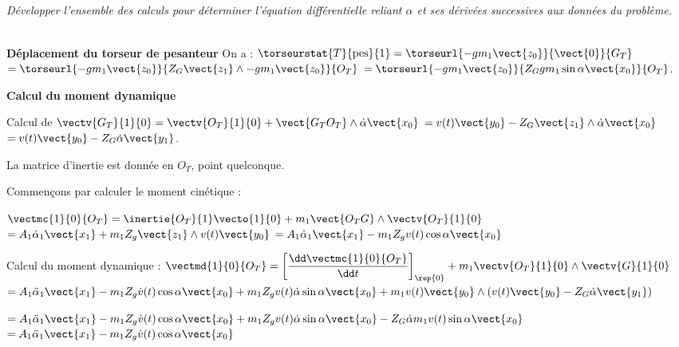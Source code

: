 \begin{multicols}{2}
\subparagraph{} \textit{Développer l'ensemble des calculs pour déterminer l'équation différentielle reliant $\alpha$ et ses dérivées
successives aux données du problème.}
\ifprof
\begin{corrige} ~\\

\textbf{Déplacement du torseur de pesanteur}
On a : $\torseurstat{T}{\text{pes}}{1} = \torseurl{-gm_1\vect{z_0}}{\vect{0}}{G_T}$ 
$= \torseurl{-gm_1\vect{z_0}}{Z_G \vect{z_1}\wedge -gm_1\vect{z_0}}{O_T}$
$= \torseurl{-gm_1\vect{z_0}}{Z_G gm_1\sin\alpha \vect{x_0}}{O_T}$.


\textbf{Calcul du moment dynamique} 

Calcul de $\vectv{G_T}{1}{0} =\vectv{O_T}{1}{0} + \vect{G_TO_T} \wedge \dot{\alpha} \vect{x_0}$
$=v(t)\vect{y_0}-Z_G\vect{z_1} \wedge \dot{\alpha}\vect{x_0}$
$=v(t)\vect{y_0}-Z_G \dot{\alpha}\vect{y_1}$.


La matrice d'inertie est donnée en $O_T$, point quelconque. 

Commençons par calculer le moment cinétique : 

$\vectmc{1}{0}{O_T} = \inertie{O_T}{1}\vecto{1}{0}+m_1\vect{O_TG} \wedge \vectv{O_T}{1}{0}$
$=A_1\dot{\alpha}_1 \vect{x_1}  + m_1 Z_g\vect{z_1} \wedge v(t) \vect{y_0}$
$=A_1\dot{\alpha}_1 \vect{x_1}  - m_1 Z_g v(t)  \cos \alpha \vect{x_0}$ %


Calcul du moment dynamique :
 $\vectmd{1}{0}{O_T}=\left[\dfrac{\dd \vectmc{1}{0}{O_T}  }{\dd t }\right]_{\rep{0}} + m_1 \vectv{O_T}{1}{0}\wedge \vectv{G}{1}{0}$
$=A_1\ddot{\alpha}_1 \vect{x_1}  - m_1 Z_g \dot{v}(t)  \cos \alpha \vect{x_0} + m_1 Z_g v(t) \dot{\alpha} \sin \alpha \vect{x_0} + m_1 v(t) \vect{y_0}  \wedge \left(v(t)\vect{y_0}-Z_G \dot{\alpha}\vect{y_1}\right) $

$=A_1\ddot{\alpha}_1 \vect{x_1}  - m_1 Z_g \dot{v}(t)  \cos \alpha \vect{x_0} + m_1 Z_g v(t) \dot{\alpha} \sin \alpha \vect{x_0} -Z_G \dot{\alpha} m_1 v(t) \sin \alpha  \vect{x_0}  $
$=A_1\ddot{\alpha}_1 \vect{x_1}  - m_1 Z_g \dot{v}(t)  \cos \alpha \vect{x_0}  $

%
%
%
%



\end{corrige}
\end{multicols}
